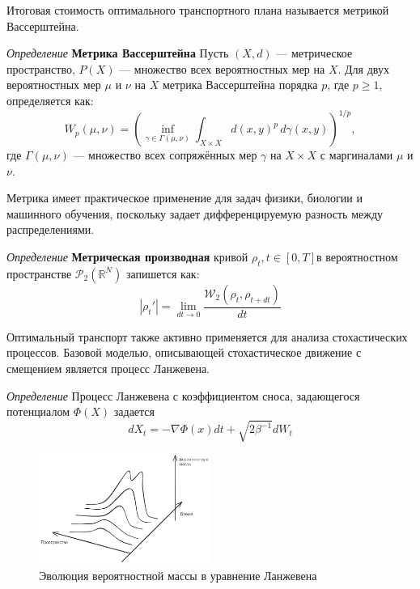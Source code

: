 Итоговая стоимость оптимального транспортного плана называется метрикой Вассерштейна.

\textit{Определение} \textbf{Метрика Вассерштейна} Пусть \((X, d)\) — метрическое пространство, \(P(X)\) — множество всех вероятностных мер на \(X\). Для двух вероятностных мер \(\mu\) и \(\nu\) на \(X\) метрика Вассерштейна порядка \(p\), где \(p \geq 1\), определяется как:
\begin{equation}
    W_p(\mu, \nu) = \left( \inf_{\gamma \in \Gamma(\mu, \nu)} \int_{X \times X} d(x, y)^p \, d\gamma(x, y) \right)^{1/p},
\end{equation}
где \(\Gamma(\mu, \nu)\) — множество всех сопряжённых мер \(\gamma\) на \(X \times X\) с маргиналами \(\mu\) и \(\nu\).

Метрика имеет практическое применение для задач физики, биологии и машинного обучения, поскольку задает 
дифференцируемую разность между распределениями.

\textit{Определение} \textbf{Метрическая производная} кривой $\rho_t,t \in [0,T]$в вероятностном пространстве $\mathcal{P}_2(\mathbb{R}^N)$ 
запишется как:
\begin{equation}
    |\rho_t'| = \lim_{dt \rightarrow 0} \frac{\mathcal{W}_2(\rho_t, \rho_{t+dt})}{dt}
\end{equation}

Оптимальный транспорт также активно применяется для анализа стохастических процессов. Базовой моделью, 
описывающей стохастическое движение с смещением является процесс Ланжевена.

\textit{Определение} Процесс Ланжевена с коэффициентом сноса, задающегося потенциалом $\Phi(X)$ задается
\begin{equation}
    d X_t = - \nabla \Phi(x) dt + \sqrt{2 \beta^{-1}} d W_t 
\end{equation}

\begin{figure}[h]
    \centering
    \includegraphics[width=0.5\textwidth]{assets/math/transport/fokker-plank.excalidraw.png}
    \caption{Эволюция вероятностной массы в уравнение Ланжевена}
    \label{opt_transport}
\end{figure}

